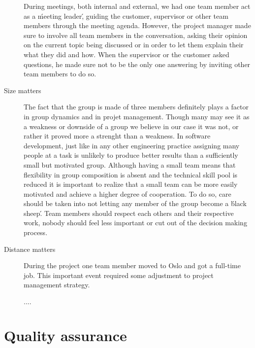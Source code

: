 \begin{description}
During meetings, both internal and external, we had one team member
act as a \'meeting leader\', guiding the customer, supervisor or other team members through
the meeting agenda. However, the project manager made sure to involve all team members
in the conversation, asking their opinion on the current topic being discussed
or in order to let them explain their what they did and how.
When the supervisor or the customer asked questions, he made sure not to be the only one
answering by inviting other team members to do so.

\item[Size matters]
The fact that the group is made of three members definitely plays a factor in group dynamics
and in projet management. Though many may see it as a weakness or downside of a group we believe
in our case it was not, or rather it proved more a strenght than a weakness.
In software development, just like in any other engineering practice assigning many people
at a task is unlikely to produce better results than a sufficiently small but motivated group.
Although having a small team means that flexibility in group composition is absent and
the technical skill pool is reduced it is important to realize that a small team
can be more easily motivated and achieve a higher degree of cooperation.
To do so, care should be taken into not letting any member of the group become
a \'black sheep\'. Team members should respect each others and their respective work,
nobody should feel less important or cut out of the decision making process.

\item[Distance matters]
During the project one team member moved to Oslo and got a full-time job.
This important event required some adjustment to project management strategy.

....



\end{description}







\section{Quality assurance}
\label{section:qa}

